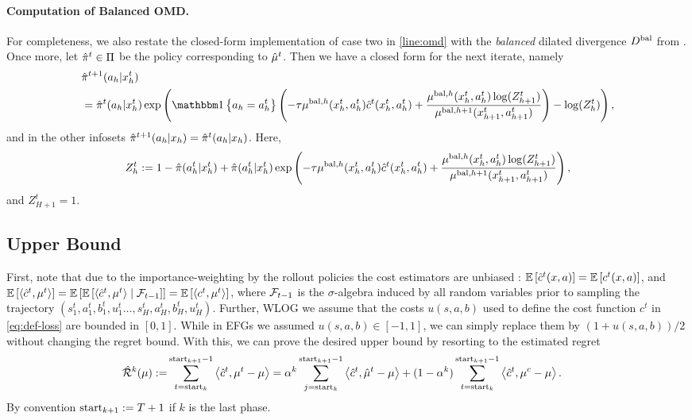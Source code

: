 \paragraph{Computation of Balanced OMD.}

\noindent For completeness, we also restate the closed-form implementation of case two in \cref{line:omd} with the \emph{balanced} dilated divergence $D^{\text{bal}}$ from \citet[Algorithm 5]{bai2022near}. Once more, let $\hat{\pi}^t\in\Pi$ be the policy corresponding to $\hat{\mu}^t$. Then we have a closed form for the next iterate, namely
\begin{align*}
    &\piHat^{t+1}(a_h|x_h^t)\\
    &=\piHat^t(a_h|x_h^t) \exp\round{ \indicator{a_h=a_h^t} \round{-\tau \mu^{\text{bal},h}(x_h^t,a_h^t) \cHat^t(x_h^t,a_h^t) + \frac{\mu^{\text{bal},h}(x_h^t,a_h^t) \log(Z_{h+1}^t)}{\mu^{\text{bal},h+1}(x_{h+1}^t,a_{h+1}^t)}} - \log(Z_h^t) },
\end{align*}
and in the other infosets $\hat{\pi}^{t+1}(a_h|x_h) = \hat{\pi}^{t}(a_h|x_h)$. Here,
\begin{align*}
    Z_h^t := 1-\hat{\pi}(a_h^t|x_h^t) + \hat{\pi}(a_h^t|x_h^t) \exp\left(  -\tau \mu^{\text{bal},h}(x_h^t,a_h^t) \hat{c}^t(x_h^t,a_h^t) + \frac{\mu^{\text{bal},h}(x_h^t,a_h^t) \log(Z_{h+1}^t)}{\mu^{\text{bal},h+1}(x_{h+1}^t,a_{h+1}^t)} \right),
\end{align*}
and $Z_{H+1}^t=1$.


\subsection{Upper Bound} \label{app:efg-upper}

First, note that due to the importance-weighting by the rollout policies the cost estimators are unbiased \citep{kozuno2021model}: $\mathbb{E}\left[ \hat{c}^t(x,a) \right] = \mathbb{E}\left[  c^t(x,a)  \right]$, and $\mathbb{E}\left[  \left\langle \hat{c}^t, \mu^t \right\rangle  \right] = \mathbb{E}\left[ \mathbb{E}\left[  \left\langle \hat{c}^t, \mu^t \right\rangle \mid \mathcal{F}_{t-1}  \right] \right] = \mathbb{E}\left[  \left\langle c^t, \mu^t \right\rangle  \right]$, where $\mathcal{F}_{t-1}$ is the $\sigma$-algebra induced by all random variables prior to sampling the trajectory $(s_1^t,a_1^t,b_1^t,u_1^t\dots,s_H^t,a_H^t,b_H^t,u_H^t)$. Further, WLOG we assume that the costs $u(s,a,b)$ used to define the cost function $c^t$ in \cref{eq:def-loss} are bounded in $[0,1]$. While in EFGs we assumed $u(s,a,b)\in[-1,1]$, we can simply replace them by $(1+u(s,a,b))/2$ without changing the regret bound. With this, we can prove the desired upper bound by resorting to the estimated regret
\begin{align}
    \hat{\mathcal{R}}^k(\mu):=& \sum_{t=\text{start}_k}^{\text{start}_{k+1}-1} \left\langle \hat{c}^t, \mu^t-\mu \right\rangle = \alpha^k \sum_{j=\text{start}_k}^{\text{start}_{k+1}-1} \left\langle \hat{c}^t, \hat{\mu}^t-\mu \right\rangle + (1-\alpha^k) \sum_{t=\text{start}_{k}}^{\text{start}_{k+1}-1} \left\langle \hat{c}^t, \mu^c-\mu \right\rangle. \label{eq:phase-reg-efg}
\end{align}
By convention $\text{start}_{k+1}:=T+1$ if $k$ is the last phase. 

